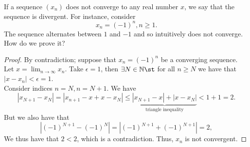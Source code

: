 \documentclass[12pt]{article}
\begin{document}

\begin{definition}
  If a sequence $(x_n)$ does not converge to any real number $x$, we say that the sequence is divergent. For instance, consider \[x_n = (-1)^n, n \geq 1.\] The sequence alternates between $1$ and $-1$ and so intuitively does not converge. How do we prove it?
\end{definition}

\begin{proof}
  By contradiction; suppose that $x_n  = (-1)^n$ be a converging sequence. Let $x = \lim_{n\to \infty}x_n$. Take $\epsilon = 1$, then $\exists N \in \mathbb{N} \st$ for all $n \geq N$ we have that $|x-x_n| < \epsilon = 1$.\\
  Consider indices $n = N, n = N+1$. We have \[|x_{N+1} - x_N| = |x_{n+1} - x + x - x_N| \leq \underbrace{|x_{N+1} -x| + |x - x_N|}_{\text{triangle inequality}} < 1 + 1 = 2.\] But we also have that $$|(-1)^{N+1}-(-1)^N| = |(-1)^{N+1}+(-1)^{N+1}| = 2,$$ We thus have that $2 < 2$, which is a contradiction. Thus, $x_n$ is not convergent.
\end{proof}
\end{document}
